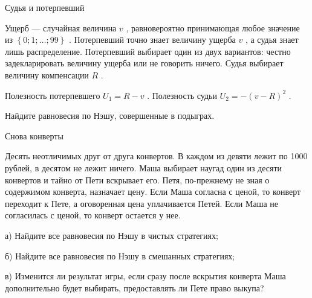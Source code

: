 \begin{problem}
 Судья и потерпевший\par
Ущерб — случайная величина  $v$ , равновероятно принимающая любое значение из  $\left\{0;1;\ldots ;99\right\}$ . Потерпевший точно знает величину ущерба  $v$ , а судья знает лишь распределение. Потерпевший выбирает один из двух вариантов: честно задекларировать величину ущерба или не говорить ничего. Судья выбирает величину компенсации  $R$ .\par
Полезность потерпевшего  $U_{1} =R-v$ . Полезность судьи  $U_{2} =-\left(v-R\right)^{2} $ .\par
Найдите равновесия по Нэшу, совершенные в подыграх.



\begin{sol}

\end{sol}
\end{problem}



\begin{problem}
 Снова конверты\par
Десять неотличимых друг от друга конвертов. В каждом из девяти лежит по 1000 рублей, в десятом не лежит ничего. Маша выбирает наугад один из десяти конвертов и тайно от Пети вскрывает его. Петя, по-прежнему не зная о содержимом конверта, назначает цену. Если Маша согласна с ценой, то конверт переходит к Пете, а оговоренная цена уплачивается Петей. Если Маша не согласилась с ценой, то конверт остается у нее.\par
а) Найдите все равновесия по Нэшу в чистых стратегиях;\par
б) Найдите все равновесия по Нэшу в смешанных стратегиях;\par
в) Изменится ли результат игры, если сразу после вскрытия конверта Маша дополнительно будет выбирать, предоставлять ли Пете право выкупа?



\begin{sol}

\end{sol}
\end{problem}



